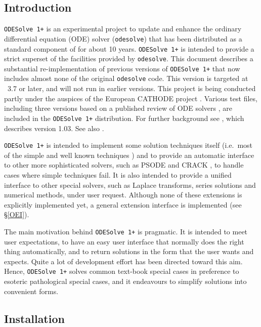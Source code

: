 
\newcommand{\ODESolve}[1]{\texttt{ODESolve\,#1}}
\newcommand{\odesolve}{\texttt{odesolve}}


\subsection{Introduction}

\ODESolve{1+} is an experimental project to update and enhance the
ordinary differential equation (ODE) solver (\odesolve{}) that has
been distributed as a standard component of \REDUCE{}
\cite{Hearn:91,MacCallum:ODESOLVE,MacCallum:88} for about 10 years.
\ODESolve{1+} is intended to provide a strict superset of the
facilities provided by \odesolve{}.  This document describes a
substantial re-implementation of previous versions of \ODESolve{1+}
that now includes almost none of the original \odesolve{} code.  This
version is targeted at \REDUCE~3.7 or later, and will not run in
earlier versions.  This project is being conducted partly under the
auspices of the European CATHODE project \cite{CATHODE}.  Various test
files, including three versions based on a published review of ODE
solvers \cite{PostelZimmermann:96}, are included in the \ODESolve{1+}
distribution.  For further background see \cite{Wright:97}, which describes
version 1.03.  See also \cite{Wright:99}.

\ODESolve{1+} is intended to implement some solution techniques itself
(i.e.\ most of the simple and well known techniques \cite{Zwillinger:92})
and to provide an automatic interface to other more sophisticated
solvers, such as PSODE \cite{Man:94a,Man:97,PrelleSinger:83} and
CRACK \cite{Brand:92}, to handle cases where simple techniques fail.
It is also intended to provide a unified interface to other special
solvers, such as Laplace transforms, series solutions and numerical
methods, under user request.  Although none of these extensions is
explicitly implemented yet, a general extension interface is
implemented (see \S\ref{OEI}).

The main motivation behind \ODESolve{1+} is pragmatic.  It is intended
to meet user expectations, to have an easy user interface that
normally does the right thing automatically, and to return solutions
in the form that the user wants and expects.  Quite a lot of
development effort has been directed toward this aim.  Hence,
\ODESolve{1+} solves common text-book special cases in preference to
esoteric pathological special cases, and it endeavours to simplify
solutions into convenient forms.


\subsection{Installation}

